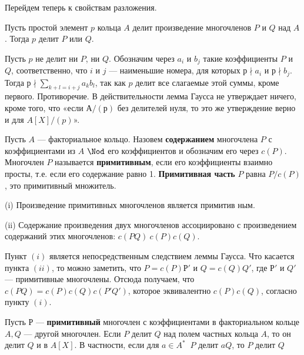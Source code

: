 Перейдем теперь к свойствам разложения.
\begin{lemma}[Гаусса]
\hspace*{0.5cm} Пусть простой элемент $p$ кольца $A$ делит произведение многочленов
$P$ и $Q$ над $A$. Тогда $p$ делит $P$ или $Q$.
\end{lemma}
\newpage
\begin{myproof}
Пусть $p$ не делит ни $P$, ни $Q$. Обозначим через $a_{i}$ и $b_{j}$ такие коэф­фициенты $P$ и $Q$, соответственно, что $i$ и $j$ — наименьшие номера, для которых $р\nmid a_{i}$ и $р\nmid b_{j}$. Тогда $р\nmid\sum\nolimits_{k+l=i+j}a_{k}b_{l}$, так как $p$ делит все слагаемые этой суммы, кроме первого. Противоречие. В действительности лемма Гаусса не утверждает ничего, кроме того, что «если $А/(р)$ без делителей нуля, то это же утверждение верно и для $A[X]/(p)$».
\end{myproof}
\begin{determ}
\hspace*{0.5cm}Пусть $A$ — факториальное кольцо. Назовем \textbf{содержанием} многочлена $P$ с коэффициентами из $A$ $\Nod$ его коэффициентов и обозначим его через $c(P)$. Многочлен $P$ называется \textbf{примитивным}, если его коэффициенты взаимно просты, т.е. если его содержание равно 1. \textbf{Примитивная часть} $P$ равна $P/c(P)$, это примитивный множитель.
\end{determ}
\begin{sled}
\hspace*{0.5cm}(i) Произведение примитивных многочленов является примитив­
ным.

(ii) Содержание произведения двух многочленов ассоциировано с
произведением содержаний этих многочленов: $c(PQ)~c(P)c(Q)$.
\end{sled}
\begin{myproof}
Пункт $(i)$ является непосредственным следствием леммы Гаусса.
Что касается пункта $(ii)$, то можно заметить, что $P = c(P)Р'$
и $Q = c(Q)Q'$, где $Р'$ и $Q'$ — примитивные многочлены. Отсю­да получаем, что $c(PQ) = c(P)c(Q)c(P'Q')$, которое эквивалентно $c(P)c(Q)$, согласно пункту $(i)$.
\end{myproof}
\begin{sled}
\hspace*{0.5cm} Пусть Р — \textbf{примитивный} многочлен с коэффициентами в факториальном кольце $A, Q$ — другой многочлен. Если $P$ делит $Q$ над полем частных кольца $A$, то он делит $Q$ и в $A[X]$. В частности, если для $a\in A^*\;\;P$ делит $aQ$, то $P$ делит $Q$
\end{sled}
